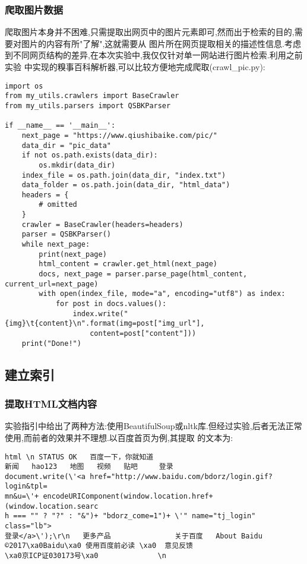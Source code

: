 \documentclass[a4paper]{article}
\begin{document}
        \subsubsection{爬取图片数据}
爬取图片本身并不困难,只需提取出网页中的图片元素即可,然而出于检索的目的,需要对图片的内容有所"了解",这就需要从
图片所在网页提取相关的描述性信息.考虑到不同网页结构的差异,在本次实验中,我仅仅针对单一网站进行图片检索.利用之前实验
中实现的糗事百科解析器,可以比较方便地完成爬取(crawl\_pic.py):
\begin{verbatim}
import os
from my_utils.crawlers import BaseCrawler
from my_utils.parsers import QSBKParser

if __name__ == '__main__':
    next_page = "https://www.qiushibaike.com/pic/"
    data_dir = "pic_data"
    if not os.path.exists(data_dir):
        os.mkdir(data_dir)
    index_file = os.path.join(data_dir, "index.txt")
    data_folder = os.path.join(data_dir, "html_data")
    headers = {
        # omitted
    }
    crawler = BaseCrawler(headers=headers)
    parser = QSBKParser()
    while next_page:
        print(next_page)
        html_content = crawler.get_html(next_page)
        docs, next_page = parser.parse_page(html_content, current_url=next_page)
        with open(index_file, mode="a", encoding="utf8") as index:
            for post in docs.values():
                index.write("{img}\t{content}\n".format(img=post["img_url"],
                    content=post["content"]))
    print("Done!")
\end{verbatim}
        \subsection{建立索引}
            \subsubsection{提取HTML文档内容}
实验指引中给出了两种方法:使用BeautifulSoup或nltk库.但经过实验,后者无法正常使用,而前者的效果并不理想.以百度首页为例,其提取
的文本为:
\begin{verbatim}
html \n STATUS OK   百度一下，你就知道                                           
新闻   hao123   地图   视频   贴吧     登录     
document.write(\'<a href="http://www.baidu.com/bdorz/login.gif?login&tpl=
mn&u=\'+ encodeURIComponent(window.location.href+ (window.location.searc
h === "" ? "?" : "&")+ "bdorz_come=1")+ \'" name="tj_login" class="lb">
登录</a>\');\r\n   更多产品               关于百度   About Baidu     
©2017\xa0Baidu\xa0 使用百度前必读 \xa0  意见反馈 
\xa0京ICP证030173号\xa0              \n
\end{verbatim}
\end{document}

